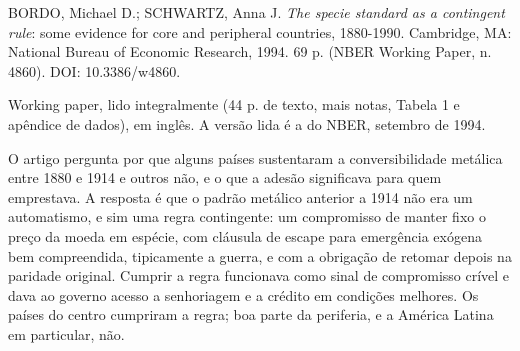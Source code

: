
\begin{identificacao}
BORDO, Michael D.; SCHWARTZ, Anna J. \textit{The specie standard as a
contingent rule}: some evidence for core and peripheral countries, 1880-1990.
Cambridge, MA: National Bureau of Economic Research, 1994. 69 p. (NBER Working
Paper, n. 4860). DOI: 10.3386/w4860.

Working paper, lido integralmente (44 p. de texto, mais notas, Tabela 1 e
apêndice de dados), em inglês. A versão lida é a do NBER, setembro de 1994.
\end{identificacao}

O artigo pergunta por que alguns países sustentaram a conversibilidade metálica
entre 1880 e 1914 e outros não, e o que a adesão significava para quem
emprestava. A resposta é que o padrão metálico anterior a 1914 não era um
automatismo, e sim uma regra contingente: um compromisso de manter fixo o preço
da moeda em espécie, com cláusula de escape para emergência exógena bem
compreendida, tipicamente a guerra, e com a obrigação de retomar depois na
paridade original. Cumprir a regra funcionava como sinal de compromisso crível
e dava ao governo acesso a senhoriagem e a crédito em condições melhores. Os
países do centro cumpriram a regra; boa parte da periferia, e a América Latina
em particular, não.

